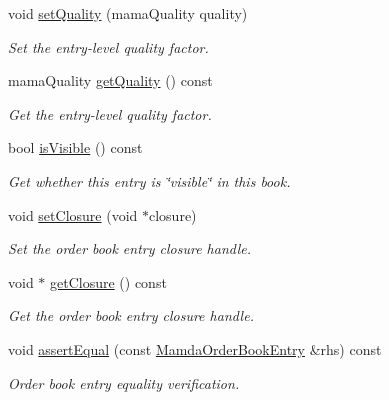 \begin{CompactItemize}
void \hyperlink{classWombat_1_1MamdaOrderBookEntry_d478ee4fa730c31a1e9fec604d60f357}{set\-Quality} (mama\-Quality quality)
\begin{CompactList}\small\item\em Set the entry-level quality factor. \item\end{CompactList}\item 
mama\-Quality \hyperlink{classWombat_1_1MamdaOrderBookEntry_34dd081ea5b06781ec96a86e211ba2b0}{get\-Quality} () const 
\begin{CompactList}\small\item\em Get the entry-level quality factor. \item\end{CompactList}\item 
bool \hyperlink{classWombat_1_1MamdaOrderBookEntry_1080d7c9464713e1b9171b105cd27190}{is\-Visible} () const 
\begin{CompactList}\small\item\em Get whether this entry is \char`\"{}visible\char`\"{} in this book. \item\end{CompactList}\item 
void \hyperlink{classWombat_1_1MamdaOrderBookEntry_649b46a82d497681198796ebf61dea3b}{set\-Closure} (void $\ast$closure)
\begin{CompactList}\small\item\em Set the order book entry closure handle. \item\end{CompactList}\item 
void $\ast$ \hyperlink{classWombat_1_1MamdaOrderBookEntry_d9674c47219a35f72beef4c5b893071d}{get\-Closure} () const 
\begin{CompactList}\small\item\em Get the order book entry closure handle. \item\end{CompactList}\item 
void \hyperlink{classWombat_1_1MamdaOrderBookEntry_17d40e2ec3b848f5fed1b81c92e7b329}{assert\-Equal} (const \hyperlink{classWombat_1_1MamdaOrderBookEntry}{Mamda\-Order\-Book\-Entry} \&rhs) const 
\begin{CompactList}\small\item\em Order book entry equality verification. \item\end{CompactList}\end{CompactItemize}
